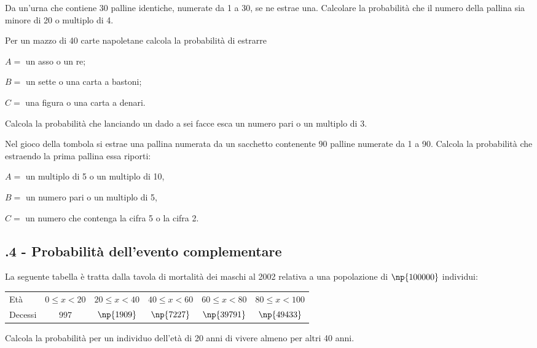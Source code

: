 \begin{esercizio}[\Ast]
 \label{ese:9.35}
Da un'urna che contiene 30 palline identiche, numerate da 1 a 30, se ne estrae una. Calcolare la probabilità che il numero della pallina sia minore di 20 o multiplo di 4.
\end{esercizio}

\begin{esercizio}
 \label{ese:9.36}
Per un mazzo di 40 carte napoletane calcola la probabilità di estrarre
\begin{itemize*}
\item $ A= $ un asso o un re;
\item $ B= $ un sette o una carta a bastoni;
\item $ C= $ una figura o una carta a denari.
\end{itemize*}
\end{esercizio}

\begin{esercizio}
 \label{ese:9.37}
Calcola la probabilità che lanciando un dado a sei facce esca un numero pari o un multiplo di 3.
\end{esercizio}

\begin{esercizio}
 \label{ese:9.38}
Nel gioco della tombola si estrae una pallina numerata da un sacchetto contenente 90 palline numerate da 1 a 90. Calcola la probabilità che estraendo la prima pallina essa riporti:
\begin{itemize*}
\item $ A= $ un multiplo di 5 o un multiplo di 10,
\item $ B= $ un numero pari o un multiplo di 5,
\item $ C= $ un numero che contenga la cifra 5 o la cifra 2.
\end{itemize*}
\end{esercizio}

\subsection*{\thechapter.4 - Probabilità dell'evento complementare}

\begin{esercizio}
 \label{ese:9.39}
La seguente tabella è tratta dalla tavola di mortalità dei maschi al 2002 relativa a una popolazione di $\np{100000}$ individui:
\begin{center}
\begin{tabular}{lccccc}
Età & $ 0\le x<20 $ &$ 20\le x<40 $ & $ 40\le x<60 $ & $ 60\le x<80 $ & $ 80\le x<100 $ \\
Decessi & $997$ & $\np{1909}$ & $\np{7227}$ & $\np{39791}$ & $\np{49433}$\\
\end{tabular}
\end{center}
Calcola la probabilità per un individuo dell'età di 20 anni di vivere almeno per altri 40 anni.
\end{esercizio}

